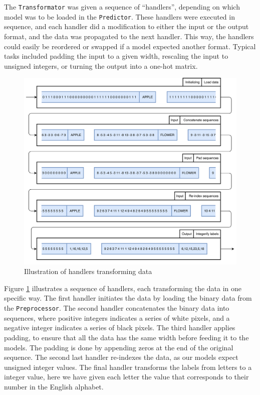 The {\tt Transformator} was given a sequence of ``handlers'', depending on which model was to be loaded in the {\tt Predictor}. These handlers were executed in sequence, and each handler did a modification to either the input or the output format, and the data was propagated to the next handler. This way, the handlers could easily be reordered or swapped if a model expected another format. Typical tasks included padding the input to a given width, rescaling the input to unsigned integers, or turning the output into a one-hot matrix.

\begin{figure}[h]
    \centering
    \includegraphics[width=1\textwidth]{fig/development_process/transformator.png}
    \caption{Illustration of handlers transforming data}
    \label{fig:development-transformator}
\end{figure}

Figure \ref{fig:development-transformator} illustrates a sequence of handlers, each transforming the data in one specific way. The first handler initiates the data by loading the binary data from the {\tt Preprocessor}. The second handler concatenates the binary data into sequences, where positive integers indicates a series of white pixels, and a negative integer indicates a series of black pixels. The third handler applies padding, to ensure that all the data has the same width before feeding it to the models. The padding is done by appending zeros at the end of the original sequence. The second last handler re-indexes the data, as our models expect unsigned integer values. The final handler transforms the labels from letters to a integer value, here we have given each letter the value that corresponds to their number in the English alphabet.

